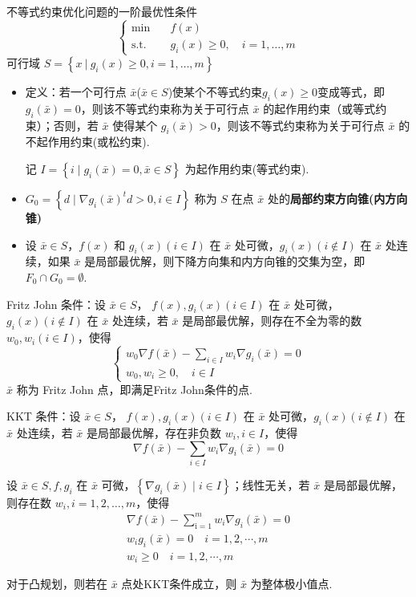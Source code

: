 \begin{remark}
    不等式约束优化问题的一阶最优性条件\[\begin{cases}
        \min \quad &f(x)\\
        \text{s.t.} \quad &g_i(x) \ge 0, \quad i = 1, \dots, m
    \end{cases}\]
    可行域 $S = \left\{x\ |\ g_i(x) \ge 0, i = 1, \dots, m\right\}$
    \begin{itemize}
        \item 定义：若一个可行点 $\bar{x}$($\bar{x} \in S$)使某个不等式约束$g_i(x) \ge 0$变成等式，即 $g_i(\bar{x}) = 0$，则该不等式约束称为关于可行点 $\bar{x}$ 的起作用约束（或等式约束）；否则，若 $\bar{x}$ 使得某个 $g_i(\bar{x}) > 0$，则该不等式约束称为关于可行点 $\bar{x}$ 的不起作用约束(或松约束).
        
        记 $I = \left\{i \mid g_i(\bar{x}) = 0, \bar{x} \in S\right\}$ 为起作用约束(等式约束).
        \item $G_0 = \left\{d \mid \nabla g_i(\bar{x})^td > 0, i \in I\right\}$ 称为 $S$ 在点 $\bar{x}$ 处的\textbf{局部约束方向锥(内方向锥)}
        \item 设 $\bar{x} \in S$，$f(x)$ 和 $g_i(x)(i \in I)$ 在 $\bar{x}$ 处可微，$g_i(x)(i \notin I)$ 在 $\bar{x}$ 处连续，如果 $\bar{x}$ 是局部最优解，则下降方向集和内方向锥的交集为空，即 $F_0\cap G_0 = \emptyset$.
    \end{itemize}
\end{remark}

\begin{theorem}
    Fritz John 条件：设 $\bar{x} \in S$， $f(x), g_i(x)(i \in I)$ 在 $\bar{x}$ 处可微，$g_i(x)(i\notin I)$ 在 $\bar{x}$ 处连续，若 $\bar{x}$ 是局部最优解，则存在不全为零的数 $w_0, w_i(i \in I)$，使得 \[\begin{cases}
        w_{0} \nabla f(\bar{x})-\sum_{i \in I} w_{i} \nabla g_{i}(\bar{x})=0 \\
        w_{0}, w_{i} \geq 0, \quad i \in I
    \end{cases}\] $\bar{x}$ 称为 Fritz John 点，即满足Fritz John条件的点.
\end{theorem}

\begin{theorem}
    KKT 条件：设 $\bar{x} \in S$， $f(x), g_i(x)(i \in I)$ 在 $\bar{x}$ 处可微，$g_i(x)(i\notin I)$ 在 $\bar{x}$ 处连续，若 $\bar{x}$ 是局部最优解，存在非负数 $w_i, i \in I$，使得\[\nabla f(\bar{x}) - \sum_{i \in I}w_i\nabla g_i(\bar{x}) = 0\]
    
    设 $\bar{x} \in S, f, g_i$ 在 $\bar{x}$ 可微，$\left\{\nabla g_i(\bar{x}) \mid i \in I\right\}$；线性无关，若 $\bar{x}$ 是局部最优解，则存在数 $w_i, i=1, 2, \dots, m$，使得\[\begin{array}{l}
        \nabla f(\bar{x})-\sum_{\mathrm{i}=1}^{m} w_{i} \nabla g_{i}(\bar{x})=0 \\
        w_{i} g_{i}(\bar{x})=0 \quad i=1,2, \cdots, m \\
        w_{i} \geq 0 \quad i=1,2, \cdots, m 
    \end{array}\]

    对于凸规划，则若在 $\bar{x}$ 点处KKT条件成立，则 $\bar{x}$ 为整体极小值点.
\end{theorem}

